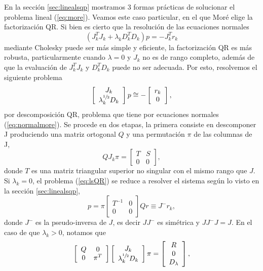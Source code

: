 \documentclass[11pt,a4paper]{book}
\theoremstyle{definition}
\theoremstyle{remark}
\begin{document}
En la sección \ref{sec:linealsqp} mostramos 3 formas prácticas de solucionar el problema lineal
(\ref{eq:more}). Veamos este caso particular, en el que
Moré elige la factorización QR. Si bien es cierto que la resolución
de las ecuaciones normales
\begin{equation}\label{eq:normalmore}
	\left(J_k^TJ_k + \lambda_k D_k^TD_k\right)p = -J_k^Tr_k
\end{equation}
mediante Cholesky puede ser más simple y eficiente, la factorización QR es más robusta, particularmente
cuando $\lambda=0$ y $J_k$ no es de rango completo, además de que la evaluación de $J_k^TJ_k$ 
y $D_k^TD_k$ puede no ser adecuada. Por esto, resolvemos el siguiente problema
\begin{equation}
	\label{eq:lsQR}
	\left[ %
	\begin{array}{c}
		J_k \\
		\lambda_k^{\sfrac{1}{2}}D_k
	\end{array}
	\right]
	p \cong -\left[
	\begin{array}{c}
		r_k \\
		0
	\end{array}
	\right],
\end{equation}
por descomposición QR, problema que tiene por ecuaciones normales (\ref{eq:normalmore}).
Se procede en dos etapas, la primera consiste en descomponer J produciendo una matriz
ortogonal $Q$ y una permutación $\pi$ de las columnas de J,
\begin{equation}
	QJ_k\pi = \left[
	\begin{array}{cc}
		T & S\\
		0 & 0
	\end{array}
	\right],
\end{equation}
donde $T$ es una matriz triangular superior no singular con el mismo rango que $J$. Si
$\lambda_k=0$, el problema (\ref{eq:lsQR}) se reduce a resolver el sistema
según lo visto en la sección \ref{sec:linealsqp},
\begin{equation}
	p=\pi
	\left[
	\begin{array}{cc}
		T^{-1} & 0\\
		0 & 0
	\end{array}
	\right]
	Qr \equiv J^{-}r_k,
\end{equation}
donde $J^{-}$ es la pseudo-inversa de $J$, es decir $JJ^{-}$ es simétrica y $JJ^{-}J=J$.
En el caso de que $\lambda_k>0$, notamos que
\begin{equation}\label{eq:QR1}
	\left[
	\begin{array}{cc}
		Q & 0\\
		0 & \pi^T
	\end{array}
	\right]
	\left[
	\begin{array}{c}
		J_k \\
		\lambda_k^{\sfrac{1}{2}}D_k
	\end{array}
	\right]
	\pi = \left[
	\begin{array}{c}
		R \\
		0 \\
		D_\lambda
	\end{array}
	\right],
\end{equation}
\end{document}
